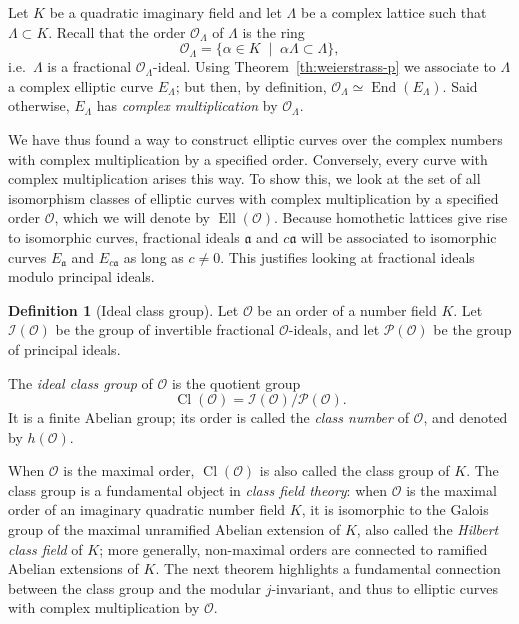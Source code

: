 \documentclass[10pt]{article}
\theoremstyle{plain}
\theoremstyle{definition}
\newtheorem{definition}[theorem]{Definition}
\DeclareMathOperator{\End}{End} %
\DeclareMathOperator{\Cl}{Cl}
\DeclareMathOperator{\Ell}{Ell}
\def\O{\ensuremath{\mathcal{O}}}
\def\a{\ensuremath{\mathfrak{a}}}
\begin{document}
\begin{prposition}
Let $K$ be a quadratic imaginary field and let $Λ$ be a complex
lattice such that $Λ⊂K$. %
Recall that the order $\O_Λ$ of $Λ$ is the ring
\begin{equation}
  \label{eq:lattice-order}
  \O_Λ = \{ α ∈ K \;\mid\; αΛ ⊂ Λ \},
\end{equation}
i.e.\ $Λ$ is a fractional $\O_Λ$-ideal. %
Using Theorem~\ref{th:weierstrass-p} we associate to $Λ$ a complex
elliptic curve $E_Λ$; but then, by definition, $\O_Λ≃\End(E_Λ)$. %
Said otherwise, $E_Λ$ has \emph{complex multiplication} by $\O_Λ$.

We have thus found a way to construct elliptic curves over the complex
numbers with complex multiplication by a specified order. %
Conversely, every curve with complex multiplication arises this way. %
To show this, we look at the set of all isomorphism classes of
elliptic curves with complex multiplication by a specified order $\O$,
which we will denote by $\Ell(\O)$. %
Because homothetic lattices give rise to isomorphic curves, fractional
ideals $\a$ and $c\a$ will be associated to isomorphic curves $E_\a$
and $E_{c\a}$ as long as $c≠0$. %
This justifies looking at fractional ideals modulo principal ideals.

\begin{definition}[Ideal class group]
  Let $\O$ be an order of a number field $K$. %
  Let $\mathcal{I}(\O)$ be the group of invertible fractional
  $\O$-ideals, and let $\mathcal{P}(\O)$ be the group of principal
  ideals. %

  The \emph{ideal class group} of $\O$ is the quotient group
  \[\Cl(\O) = \mathcal{I}(\O)/\mathcal{P}(\O).\]
  It is a finite Abelian group; its order is called the \emph{class
    number} of $\O$, and denoted by $h(\O)$.
\end{definition}

When $\O$ is the maximal order, $\Cl(\O)$ is also called the class
group of $K$. %
The class group is a fundamental object in \emph{class field theory}:
when $\O$ is the maximal order of an imaginary quadratic number field
$K$, it is isomorphic to the Galois group
of the maximal unramified Abelian extension of $K$, also called the
\emph{Hilbert class field} of $K$; more generally, non-maximal orders
are connected to ramified Abelian extensions of $K$. %
The next theorem highlights a fundamental connection between the class
group and the modular $j$-invariant, and thus to elliptic curves with
complex multiplication by $\O$.


\end{prposition}
\end{document}
